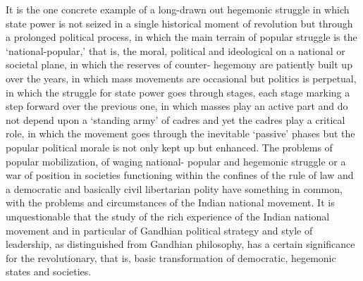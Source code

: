 \begin{multicols}{2}
It is the one concrete example of a long-drawn out hegemonic struggle in which state power is not seized in a single historical moment of revolution but through a prolonged political process, in which the main terrain of popular struggle is the `national-popular,' that is, the moral, political and ideological on a national or societal plane, in which the reserves of counter- hegemony are patiently built up over the years, in which mass movements are occasional but politics is perpetual, in which the struggle for state power goes through stages, each stage marking a step forward over the previous one, in which masses play an active part and do not depend upon a `standing army' of cadres and yet the cadres play a critical role, in which the movement goes through the inevitable `passive' phases but the popular political morale is not only kept up but enhanced. The problems of popular mobilization, of waging national- popular and hegemonic struggle or a war of position in societies functioning within the confines of the rule of law and a democratic and basically civil libertarian polity have something in common, with the problems and circumstances of the Indian national movement. It is unquestionable that the study of the rich experience of the Indian national movement and in particular of Gandhian political strategy and style of leadership, as distinguished from Gandhian philosophy, has a certain significance for the revolutionary, that is, basic transformation of democratic, hegemonic states and societies.
\end{multicols}